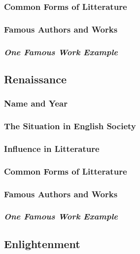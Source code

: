 \subsubsection{Common Forms of Litterature}

\subsubsection{Famous Authors and Works}

\subsubsection{\textit{One Famous Work Example}}

\newpage
\subsection{Renaissance}

\subsubsection{Name and Year}

\subsubsection{The Situation in English Society}

\subsubsection{Influence in Litterature}

\subsubsection{Common Forms of Litterature}

\subsubsection{Famous Authors and Works}

\subsubsection{\textit{One Famous Work Example}}

\newpage
\subsection{Enlightenment}


